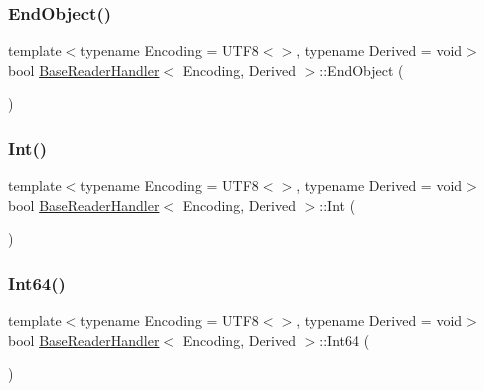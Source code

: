 \mbox{\label{structBaseReaderHandler_a0406cee0af26bc3a0b7fb2414537b0ab}} 
\subsubsection{\texorpdfstring{End\+Object()}{EndObject()}}
{\footnotesize\ttfamily template$<$typename Encoding = U\+T\+F8$<$$>$, typename Derived = void$>$ \\
bool \hyperlink{structBaseReaderHandler}{Base\+Reader\+Handler}$<$ Encoding, Derived $>$\+::End\+Object (\begin{DoxyParamCaption}\item[{\hyperlink{rapidjson_8h_a5ed6e6e67250fadbd041127e6386dcb5}{Size\+Type}}]{ }\end{DoxyParamCaption})\hspace{0.3cm}{\ttfamily [inline]}}

\mbox{\label{structBaseReaderHandler_a85e813aaf7189a2f87bd53953324fafc}} 
\subsubsection{\texorpdfstring{Int()}{Int()}}
{\footnotesize\ttfamily template$<$typename Encoding = U\+T\+F8$<$$>$, typename Derived = void$>$ \\
bool \hyperlink{structBaseReaderHandler}{Base\+Reader\+Handler}$<$ Encoding, Derived $>$\+::Int (\begin{DoxyParamCaption}\item[{int}]{ }\end{DoxyParamCaption})\hspace{0.3cm}{\ttfamily [inline]}}

\mbox{\label{structBaseReaderHandler_a04011733ea584739c97ad5c6afa15a35}} 
\subsubsection{\texorpdfstring{Int64()}{Int64()}}
{\footnotesize\ttfamily template$<$typename Encoding = U\+T\+F8$<$$>$, typename Derived = void$>$ \\
bool \hyperlink{structBaseReaderHandler}{Base\+Reader\+Handler}$<$ Encoding, Derived $>$\+::Int64 (\begin{DoxyParamCaption}\item[{\hyperlink{stdint_8h_a414156feea104f8f75b4ed9e3121b2f6}{int64\+\_\+t}}]{ }\end{DoxyParamCaption})\hspace{0.3cm}{\ttfamily [inline]}}

